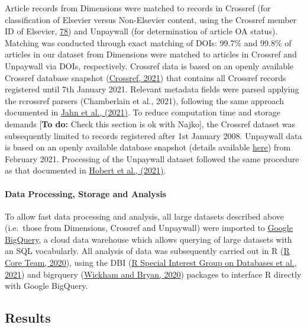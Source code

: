 \documentclass[
]{article}
\begin{document}
Article records from Dimensions were matched to records in Crossref (for classification of Elsevier versus Non-Elsevier content, using the Crossref member ID of Elsevier, \href{https://www.crossref.org/members/prep/78}{78}) and Unpaywall (for determination of article OA status). Matching was conducted through exact matching of DOIs: 99.7\% and 99.8\% of articles in our dataset from Dimensions were matched to articles in Crossref and Unpaywall via DOIs, respectively. Crossref data is based on an openly available Crossref database snapshot (\href{https://academictorrents.com/details/e4287cb7619999709f6e9db5c359dda17e93d515}{Crossref, 2021}) that contains all Crossref records registered until 7th January 2021. Relevant metadata fields were parsed applying the rcrossref parsers (Chamberlain et al., 2021), following the same approach documented in \href{https://arxiv.org/abs/2102.04789}{Jahn et al., (2021)}. To reduce computation time and storage demands {[}\textbf{To do:} Check this section is ok with Najko{]}, the Crossref dataset was subsequently limited to records registered after 1st January 2008. Unpaywall data is based on an openly available database snapshot (details available \href{https://unpaywall.org/products/snapshot}{here}) from February 2021. Processing of the Unpaywall dataset followed the same procedure as that documented in \href{https://edoc.hu-berlin.de/handle/18452/23336}{Hobert et al., (2021)}.

\hypertarget{data-processing-storage-and-analysis}{%
\paragraph{Data Processing, Storage and Analysis}\label{data-processing-storage-and-analysis}}

To allow fast data processing and analysis, all large datasets described above (i.e.~those from Dimensions, Crossref and Unpaywall) were imported to \href{https://cloud.google.com/bigquery}{Google BigQuery}, a cloud data warehouse which allows querying of large datasets with an SQL vocabularly. All analysis of data was subsequently carried out in R (\href{http://www.R-project.org/}{R Core Team, 2020}), using the DBI (\href{https://CRAN.R-project.org/package=DBI}{R Special Interest Group on Databases et al., 2021}) and bigrquery (\href{https://CRAN.R-project.org/package=bigrquery}{Wickham and Bryan, 2020}) packages to interface R directly with Google BigQuery.

\hypertarget{results}{%
\subsection{Results}\label{results}}
\end{document}
